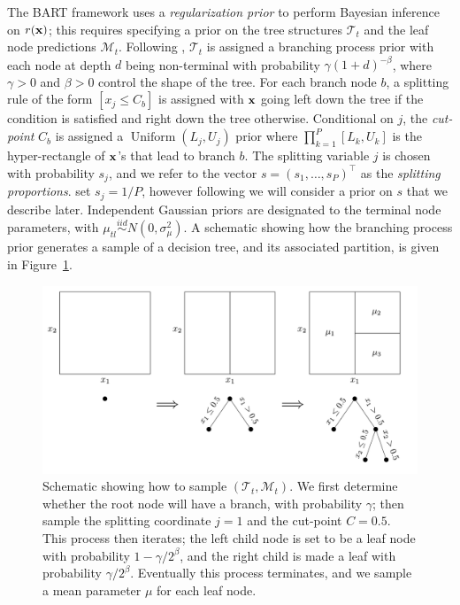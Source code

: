 \documentclass[12pt]{article}
\newcommand{\sM}{\mathcal M}
\newcommand{\Tree}{\mathcal T}
\newcommand{\bfx}{{\bf x}}
\newcommand{\Uniform}{\operatorname{Uniform}}
\begin{document}
The BART framework uses a \emph{regularization prior} to perform Bayesian inference on $r(\bfx)$; this requires specifying a prior on the tree structures $\Tree_t$ and the leaf node predictions $\sM_t$. Following \citet{chipman2010bart}, $\Tree_t$ is assigned a branching process prior with each node at depth $d$ being non-terminal with probability $\gamma (1 + d)^{-\beta}$, where $\gamma > 0$ and $\beta > 0$ control the shape of the tree. For each branch node $b$, a splitting rule of the form $[x_j \le C_b]$ is assigned with $\bfx$ going left down the tree if the condition is satisfied and right down the tree otherwise. Conditional on $j$, the \emph{cut-point} $C_b$ is assigned a $\Uniform(L_j, U_j)$ prior where $\prod_{k = 1}^P [L_k, U_k]$ is the hyper-rectangle of $\bfx$'s that lead to branch $b$. The splitting variable $j$ is chosen with probability $s_j$, and we refer to the vector $s = (s_1, \ldots, s_P)^{\top}$ as the \emph{splitting proportions}. \citet{chipman2010bart} set $s_j = 1 / P$, however following \citet{linero2016bayesian} we will consider a prior on $s$ that we describe later.     Independent Gaussian priors are designated to the terminal node parameters, with $\mu_{tl} \stackrel{iid}{\sim} N(0,\sigma^2_\mu).$ A schematic showing how the branching process prior generates a sample of a decision tree, and its associated 
partition, is given in Figure~\ref{fig:TreeGrow}.

 
\begin{figure}
     \centering
     \includegraphics[width=.8\textwidth]{TreeGrow}
     \caption{Schematic showing how to sample $(\Tree_t, \mathcal M_t)$. We first determine whether the root node will have a branch, with probability $\gamma$; then sample the splitting coordinate $j = 1$ and the cut-point $C = 0.5$. This process then iterates; the left child node is set to be a leaf node with probability $1 - \gamma/2^\beta$, and the right child is made a leaf with probability $\gamma/2^\beta$. Eventually this process terminates, and we sample a mean parameter $\mu$ for each leaf node.}
     \label{fig:TreeGrow}
\end{figure}
\end{document}
